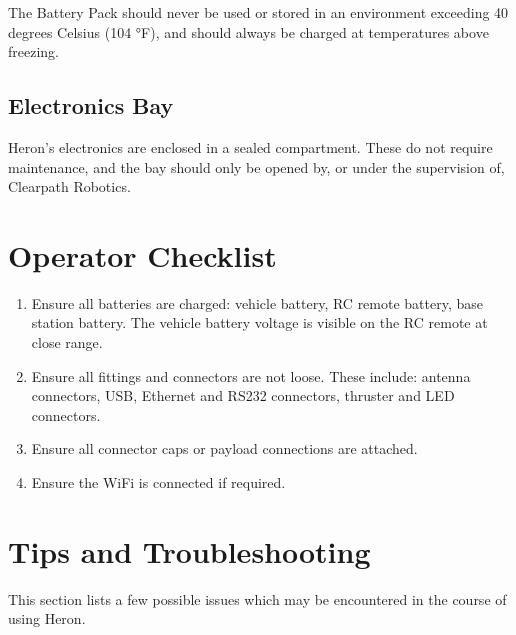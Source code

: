 \documentclass[]{clearpath-latex/clearpath-manual}
\begin{document}
The Battery Pack should never be used or stored in an environment exceeding 40 degrees Celsius (104 °F), and should always be charged at temperatures above freezing.

\subsection{Electronics Bay}
Heron's electronics are enclosed in a sealed compartment. These do not require maintenance, and the bay should only be opened by, or under the supervision of, Clearpath Robotics.

\newpage

\section{Operator Checklist}

\begin{enumerate}
\item Ensure all batteries are charged: vehicle battery, RC remote battery, base station battery. The vehicle battery voltage is visible on the RC remote at close range.
\item Ensure all fittings and connectors are not loose. These include: antenna connectors, USB, Ethernet and RS232 connectors, thruster and LED connectors.
\item Ensure all connector caps or payload connections are attached.
\item Ensure the WiFi is connected if required.
\end{enumerate}

\newpage

\section{Tips and Troubleshooting}
This section lists a few possible issues which may be encountered in the course of using Heron.
\end{document}

